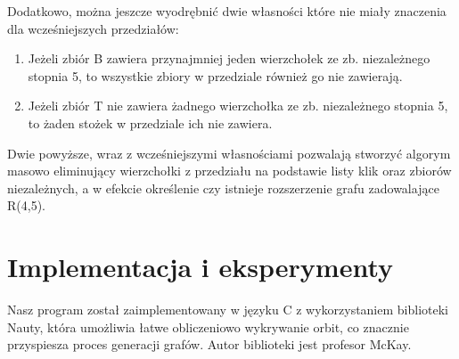 \documentclass[11pt]{article}
\begin{document}
Dodatkowo, można jeszcze wyodrębnić dwie własności które nie miały znaczenia dla wcześniejszych przedziałów:
\begin{enumerate}
\item Jeżeli zbiór B zawiera przynajmniej jeden wierzchołek ze zb. niezależnego stopnia 5, to wszystkie zbiory w przedziale również go nie zawierają. 

\item Jeżeli zbiór T nie zawiera żadnego wierzchołka ze zb. niezależnego stopnia 5, to żaden stożek w przedziale ich nie zawiera.
\end {enumerate}
Dwie powyższe, wraz z wcześniejszymi własnościami pozwalają stworzyć algorym masowo eliminujący wierzchołki z przedziału na podstawie listy klik oraz zbiorów niezależnych, a w efekcie określenie czy istnieje rozszerzenie grafu zadowalające R(4,5).

\section{Implementacja i eksperymenty}
Nasz program został zaimplementowany w języku C z wykorzystaniem biblioteki Nauty, która umożliwia łatwe obliczeniowo wykrywanie orbit, co znacznie przyspiesza proces generacji grafów. 
Autor biblioteki jest profesor McKay. 
\end{document}
